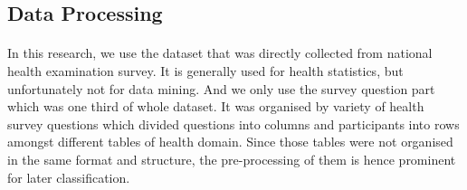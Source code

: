 \documentclass[runningheads]{llncs}
\begin{document}
\subsection{Data Processing}
%
\paragraph{}
In this research, we use the dataset that was directly collected from national health examination survey. It is generally used for health statistics, but unfortunately not for data mining. And we only use the survey question part which was one third of whole dataset. It was organised by variety of health survey questions which divided questions into columns and participants into rows amongst different tables of health domain. Since those tables were not organised in the same format and structure, the pre-processing of them is hence prominent for later classification. 
\end{document}
